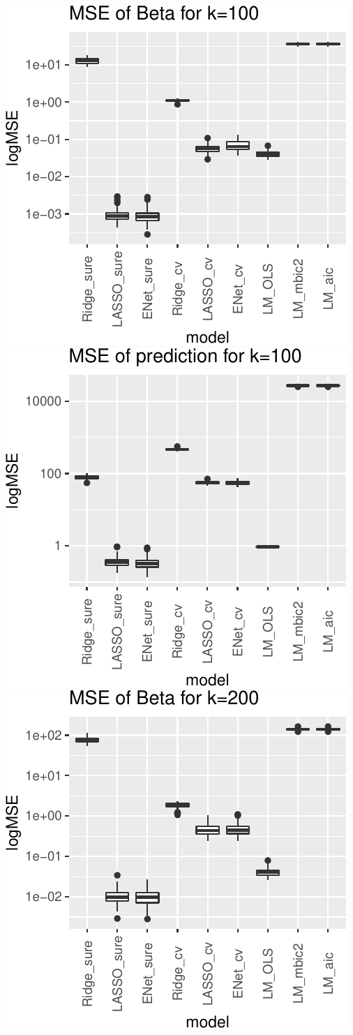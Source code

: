 \documentclass[
]{article}
\begin{document}
\includegraphics[width=0.8\linewidth]{report_files/figure-latex/unnamed-chunk-15-3}
\includegraphics[width=0.8\linewidth]{report_files/figure-latex/unnamed-chunk-15-4}
\includegraphics[width=0.8\linewidth]{report_files/figure-latex/unnamed-chunk-15-5}
\end{document}
